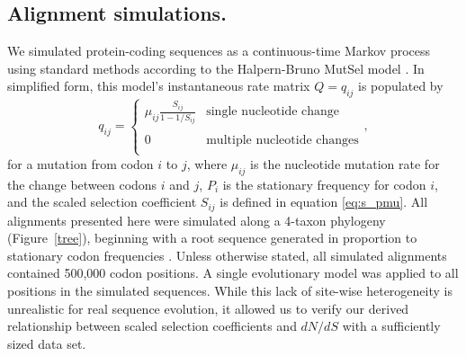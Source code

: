 \documentclass[11pt]{article}
\begin{document}
\subsection*{Alignment simulations.}
We simulated protein-coding sequences as a continuous-time Markov process using standard methods \cite{Yang2006} according to the Halpern-Bruno MutSel model \cite{HalpernBruno1998}. In simplified form, this model's instantaneous rate matrix $Q = q_{ij}$ is populated by
\begin{equation}\label{eq:HBmatrix}
q_{ij} = \left\{ 
\begin{array}{rl}
\mu_{ij} \frac{S_{ij}}{1-1/S_{ij}} &\mbox{single nucleotide change} \\\\
0                                  &\mbox{multiple nucleotide changes} \\             
\end{array} \right.,
\end{equation} for a mutation from codon $i$ to $j$, where $\mu_{ij}$ is the nucleotide mutation rate for the change between codons $i$ and $j$, $P_i$ is the stationary frequency for codon $i$, and the scaled selection coefficient $S_{ij}$ is defined in equation \eqref{eq:s_pmu}. All alignments presented here were simulated along a 4-taxon phylogeny (Figure~\ref{tree}), beginning with a root sequence generated in proportion to  stationary codon frequencies \cite{Yang2006}. Unless otherwise stated, all simulated alignments contained 500,000 codon positions. A single evolutionary model was applied to all positions in the simulated sequences. While this lack of site-wise heterogeneity is unrealistic for real sequence evolution, it allowed us to verify our derived relationship between scaled selection coefficients and $dN/dS$ with a sufficiently sized data set.

	
\end{document}
